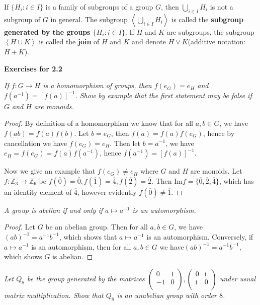 If $\{H_i:i\in I\}$ is a family of subgroups of a group $G$, then $\bigcup_{i\in I}H_i$ is not a subgroup of $G$ in general. The subgroup $\left<\bigcup_{i\in I}H_i\right>$ is called the \textbf{subgroup generated by the groups $\{H_i:i\in I\}$}. If $H$ and $K$ are subgroups, the subgroup $\left<H\cup K\right>$ is called the \textbf{join} of $H$ and $K$ and denote $H\vee K$(additive notation:$H+K$).
\begin{center}
\begin{large}
    \textbf{Exercises for 2.2}
\end{large}
\end{center}
\begin{problem}\em
If $f:G\to H$ is a homomorphism of groups, then $f(e_G)=e_H$ and $f(a^{-1})=[f(a)]^{-1}$. Show by example that the first statement may be false if $G$ and $H$ are monoids.
\end{problem}
\begin{proof}
By definition of a homomorphism we know that for all $a,b\in G$, we have $f(ab)=f(a)f(b)$. Let $b=e_G$, then $f(a)=f(a)f(e_G)$, hence by cancellation we have $f(e_G)=e_H$. Then let $b=a^{-1}$, we have $e_H=f(e_G)=f(a)f(a^{-1})$, hence $f(a^{-1})=[f(a)]^{-1}$.\par
Now we give an example that $f(e_G)\ne e_H$ where $G$ and $H$ are monoids. Let $f:\mathbb{Z}_3\to\mathbb{Z}_6$ be $f(\overline{0})=\overline{0},f(\overline{1})=\overline{4},f(\overline{2})=\overline{2}$. Then $\mathrm{Im}f=\{\overline{0},\overline{2},\overline{4}\}$, which has an identity element of $\overline{4}$, however evidently $f(\overline{0})\ne\overline{1}$.
\end{proof}
\begin{problem}\em
A group is abelian if and only if $a\mapsto a^{-1}$ is an automorphism.
\end{problem}
\begin{proof}
Let $G$ be an abelian group. Then for all $a,b\in G$, we have $(ab)^{-1}=a^{-1}b^{-1}$, which shows that $a\mapsto a^{-1}$ is an automorphism. Conversely, if $a\mapsto a^{-1}$ is an automorphism, then for all $a,b\in G$ we have$(ab)^{-1}=a^{-1}b^{-1}$, which shows $G$ is abelian.
\end{proof}
\begin{problem}\em
Let $Q_8$ be the group generated by the matrices $
\left( \begin{matrix}
	0&		1\\
	-1&		0\\
\end{matrix} \right) ,\left( \begin{matrix}
	0&		\mathrm{i}\\
	\mathrm{i}&		0\\
\end{matrix} \right) 
$ under usual matrix multiplication. Show that $Q_8$ is an unabelian group with order $8$.
\end{problem}

